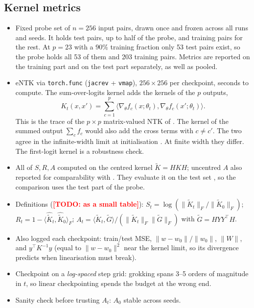 \documentclass[a4paper,11pt]{article} %
\newcommand{\TODO}[1]{\textcolor{red}{\textbf{[TODO: #1]}}}
\newcommand{\Kt}{\widetilde{K}}
\newcommand{\Fnorm}[1]{\lVert #1 \rVert_F}
\begin{document}
\subsection{Kernel metrics}
\begin{itemize}
	\item Fixed probe set of $n=256$ input pairs, drawn once and frozen across
		all runs and seeds. It holds test pairs, up to half of the probe, and
		training pairs for the rest. At $p=23$ with a $90\%$ training fraction
		only 53 test pairs exist, so the probe holds all 53 of them and 203
		training pairs. Metrics are reported on the training part and on the test
		part separately, as well as pooled.
	\item eNTK via \texttt{torch.func} (\texttt{jacrev} + \texttt{vmap}),
		$256\times256$ per checkpoint, seconds to compute. The sum-over-logits
		kernel adds the kernels of the $p$ outputs,
		\[
			K_t(x,x')=\sum_{c=1}^{p}\big\langle\nabla_\theta f_c(x;\theta_t),
			\nabla_\theta f_c(x';\theta_t)\big\rangle .
		\]
		This is the trace of the $p\times p$ matrix-valued
		NTK of \citet{jacot2018ntk}. The kernel of the summed output $\sum_c f_c$
		would also add the cross terms with $c\neq c'$. The two agree in the
		infinite-width limit at initialisation \citep[Theorem~1, arXiv
		v4]{jacot2018ntk}. At finite width they differ. The first-logit kernel is a
		robustness check.
	\item All of $S,R,A$ computed on the centred kernel $\Kt=HKH$; uncentred $A$
		also reported for comparability with \citet{kumar2024grokking}. They
		evaluate it on the test set \citep[Section~5, arXiv v3]{kumar2024grokking},
		so the comparison uses the test part of the probe.
	\item Definitions (\TODO{as a small table}): $S_t=\log(\Fnorm{\Kt_t}/\Fnorm{\Kt_0})$;
		$R_t=1-\langle\widehat{\Kt}_t,\widehat{\Kt}_0\rangle_F$;
		$A_t=\langle\Kt_t,\widetilde G\rangle/(\Fnorm{\Kt_t}\Fnorm{\widetilde G})$
		with $\widetilde G=HYY^\top H$.
	\item Also logged each checkpoint: train/test MSE, $\lVert w-w_0\rVert/\lVert
		w_0\rVert$, $\lVert W\rVert$, and $y^\top K^{-1}y$ (equal to
		$\lVert w-w_0\rVert^2$ near the kernel limit, so its divergence predicts
		when linearisation must break).
	\item Checkpoint on a \emph{log-spaced} step grid: grokking spans 3--5 orders
		of magnitude in $t$, so linear checkpointing spends the budget at the wrong
		end.
	\item Sanity check before trusting $A_t$: $A_0$ stable across seeds.
\end{itemize}
\end{document}
